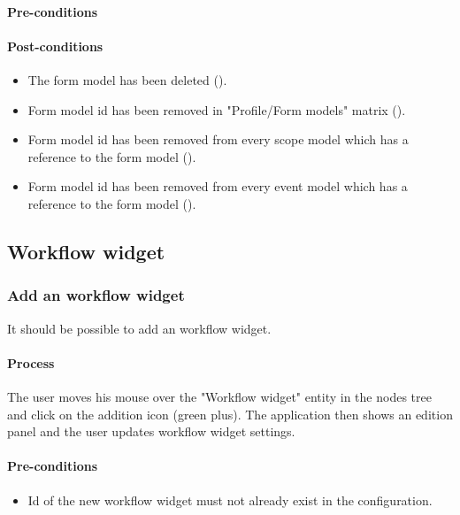 \documentclass[11pt,a4paper,oneside]{article}
\begin{document}
\paragraph{Pre-conditions}

\paragraph{Post-conditions}
\begin{itemize}
	\item The form model has been deleted ().
	\item Form model id has been removed in "Profile/Form models" matrix ().
	\item Form model id has been removed from every scope model which has a reference to the form model ().
	\item Form model id has been removed from every event model which has a reference to the form model ().
\end{itemize}

\subsection{Workflow widget}

\subsubsection{Add an workflow widget}
It should be possible to add an workflow widget.

\paragraph{Process}
The user moves his mouse over the "Workflow widget" entity in the nodes tree and click on the addition icon (green plus). The application then shows an edition panel and the user updates workflow widget settings.

\paragraph{Pre-conditions}
\begin{itemize}
	\item Id of the new workflow widget must not already exist in the configuration.
\end{itemize}
\end{document}
